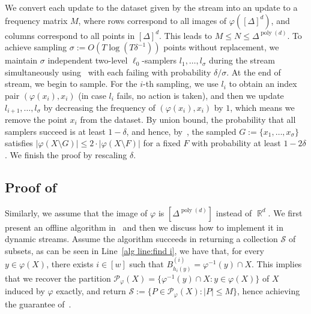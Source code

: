 \documentclass[letterpaper,11pt]{article}
\theoremstyle{plain}
\theoremstyle{definition}
\theoremstyle{remark}
\DeclareMathOperator{\R}{\mathbb{R}}
\DeclareMathOperator{\poly}{poly}
\renewcommand{\phi}{\varphi}
\newcommand{\calP}{\mathcal{P}}
\newcommand{\calS}{\mathcal{S}}
\begin{document}
\begin{appendices}
    We convert each update to the dataset given by the stream into an update to a frequency matrix $M$, where rows correspond to all images of $\phi([\Delta]^d)$, and columns correspond to all points in $[\Delta]^d$. This leads to $M\le N\le \Delta^{\poly(d)}$.
To achieve sampling $\sigma:=O(T\log(T\delta^{-1}))$ points without replacement, 
    we maintain $\sigma$ independent two-level $\ell_0$-samplers $l_1,\dots,l_\sigma$ during the stream simultaneously using~ with each failing with probability $\delta/\sigma$. At the end of stream, we begin to sample.
For the $i$-th sampling, we use $l_i$ to obtain an index pair $(\phi(x_i),x_i)$ (in case $l_i$ fails, no action is taken), and then we update $l_{i+1},\dots,l_{\sigma}$ by decreasing the frequency of $(\phi(x_i),x_i)$ by $1$, which means we remove the point $x_i$ from the dataset.
By union bound,
the probability that all samplers succeed is at least $1-\delta$, and hence, by~, the sampled $G:=\{x_1,\dots,x_{\sigma}\}$ satisfies $|\phi(X\setminus G)|\le 2\cdot |\phi(X\setminus F)|$ for a fixed $F$ with probability at least $1-2\delta$. We finish the proof by rescaling $\delta$.


\subsection{Proof of~}
\label{sec:find light parts}
\IndentifySparseSubsets*

Similarly, we assume that the image of $\phi$ is $[\Delta^{\poly(d)}]$ instead of $\R^d$.
We first present an offline algorithm in~ and then we discuss how to implement it in dynamic streams. Assume the algorithm succeeds in returning a collection $\calS$ of subsets, as can be seen in Line~\ref{alg line:find i}, we have that, for every $y\in \phi(X)$, there exists $i\in [w]$ such that $B^{(i)}_{h_i(y)} = \phi^{-1}(y)\cap X$. This implies that we recover the partition $\calP_\phi(X)=\{\phi^{-1}(y)\cap X:y\in \phi(X) \}$ of $X$ induced by $\phi$ exactly, and return $\calS:=\{P\in \calP_\phi(X): |P|\le  M\}$, hence achieving the guarantee of~.


\end{appendices}
\end{document}
